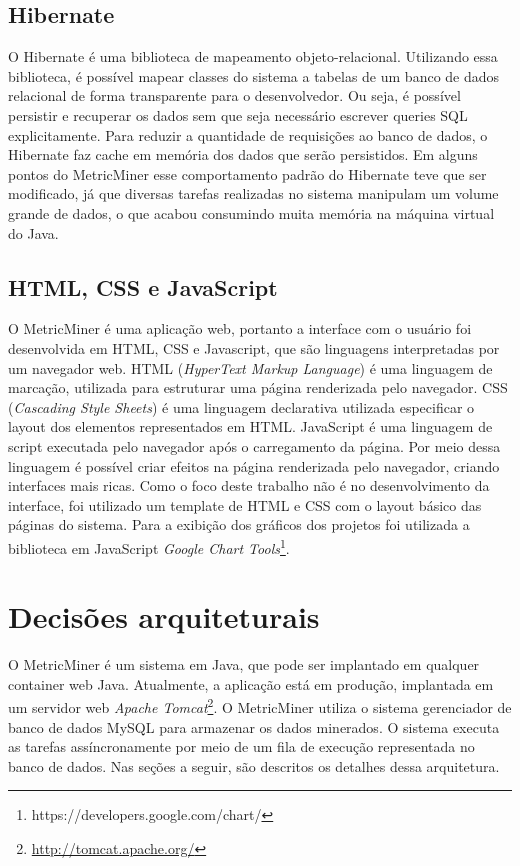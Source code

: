 \documentclass[a4paper, 12pt, twoside]{book}
\begin{document}
        \subsection*{Hibernate}
            O Hibernate é uma biblioteca de mapeamento objeto-relacional. Utilizando essa biblioteca, é possível mapear classes do sistema a tabelas de um banco de dados relacional de forma transparente para o desenvolvedor. Ou seja, é possível persistir e recuperar os dados sem que seja necessário escrever queries SQL explicitamente. Para reduzir a  quantidade de requisições ao banco de dados, o Hibernate faz cache em memória dos dados que serão persistidos. Em alguns pontos do MetricMiner esse comportamento padrão do Hibernate teve que ser modificado, já que diversas tarefas realizadas no sistema manipulam um volume grande de dados, o que acabou consumindo muita memória na máquina virtual do Java.

        \subsection*{HTML, CSS e JavaScript}
            O MetricMiner é uma aplicação web, portanto a interface com o usuário foi desenvolvida em HTML, CSS e Javascript, que são linguagens interpretadas por um navegador web. HTML (\textit{HyperText Markup Language}) é uma linguagem de marcação, utilizada para estruturar uma página renderizada pelo navegador. CSS (\textit{Cascading Style Sheets}) é uma linguagem declarativa utilizada especificar o layout dos elementos representados em HTML. JavaScript é uma linguagem de script executada pelo navegador após o carregamento da página. Por meio dessa linguagem é possível criar efeitos na página renderizada pelo navegador, criando interfaces mais ricas. Como o foco deste trabalho não é no desenvolvimento da interface, foi utilizado um template de HTML e CSS com o layout básico das páginas do sistema. Para a exibição dos gráficos dos projetos foi utilizada a biblioteca em JavaScript \textit{Google Chart Tools}\footnote{https://developers.google.com/chart/}.



    \section{Decisões arquiteturais} \label{sc:arquitetura}

    O MetricMiner é um sistema em Java, que pode ser implantado em qualquer container web Java. Atualmente, a aplicação está em produção, implantada em um servidor web \textit{Apache Tomcat}\footnote{\url{http://tomcat.apache.org/}}. O MetricMiner utiliza o sistema gerenciador de banco de dados MySQL para armazenar os dados minerados. O sistema executa as tarefas assíncronamente por meio de um fila de execução representada no banco de dados. Nas seções a seguir, são descritos os detalhes dessa arquitetura.
\end{document}
